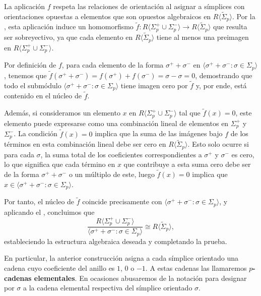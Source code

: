 La aplicación \(f\) respeta las relaciones de orientación al asignar a símplices con orientaciones opuestas a elementos que son opuestos algebraicos en \(R \langle \tilde{\Sigma}_p \rangle\). Por la 	, esta aplicación induce un homomorfismo \(\tilde{f} : R\langle \Sigma_p^+ \cup \Sigma_p^- \rangle \to R \langle \tilde{\Sigma}_p \rangle\) que resulta ser sobreyectivo, ya que cada elemento en \(R \langle \tilde{\Sigma}_p \rangle\) tiene al menos una preimagen en \(R\langle \Sigma_p^+ \cup \Sigma_p^- \rangle\).

Por definición de \(f\), para cada elemento de la forma \(\sigma^+ + \sigma^-\) en \(\langle \sigma^+ + \sigma^- : \sigma \in \Sigma_p \rangle\), tenemos que \(\tilde{f}(\sigma^+ + \sigma^-) = f(\sigma^+) + f(\sigma^-) = \sigma - \sigma = 0\), demostrando que todo el submódulo \(\langle \sigma^+ + \sigma^- : \sigma \in \Sigma_p \rangle\) tiene imagen cero por \(\tilde{f}\) y, por ende, está contenido en el núcleo de \(\tilde{f}\).

Además, si consideramos un elemento \(x\) en \(R\langle \Sigma_p^+ \cup \Sigma_p^- \rangle\) tal que \(\tilde{f}(x) = 0\), este elemento puede expresarse como una combinación lineal de elementos en \(\Sigma_p^+\) y \(\Sigma_p^-\). La condición \(\tilde{f}(x) = 0\) implica que la suma de las imágenes bajo \(f\) de los términos en esta combinación lineal debe ser cero en \(R \langle \tilde{\Sigma}_p \rangle\). Esto solo ocurre si para cada \(\sigma\), la suma total de los coeficientes correspondientes a \(\sigma^+\) y \(\sigma^-\) es cero, lo que significa que cada término en \(x\) que contribuye a esta suma cero debe ser de la forma \(\sigma^+ + \sigma^-\) o un múltiplo de este, luego \(\tilde{f}(x) = 0\) implica que \(x \in \langle \sigma^+ + \sigma^- : \sigma \in \Sigma_p \rangle \).

Por tanto, el núcleo de \(\tilde{f}\) coincide precisamente con \(\langle \sigma^+ + \sigma^- : \sigma \in \Sigma_p \rangle\), y aplicando el , concluimos que 
\[
\frac{R\langle \Sigma_p^+ \cup \Sigma_p^- \rangle}{\langle \sigma^+ + \sigma^- : \sigma \in \Sigma_p \rangle} \cong R \langle \tilde{\Sigma}_p \rangle,
\]
estableciendo la estructura algebraica deseada y completando la prueba.

\begin{observacion}
	En particular, la anterior construcción asigna a cada símplice orientado una cadena cuyo coeficiente del anillo es $1$, $0$ o $-1$. A estas cadenas las llamaremos \textbf{$p$-cadenas elementales}. En ocasiones abusaremos de la notación para designar por $\sigma$ a la cadena elemental respectiva del símplice orientado $\sigma$.
\end{observacion}

